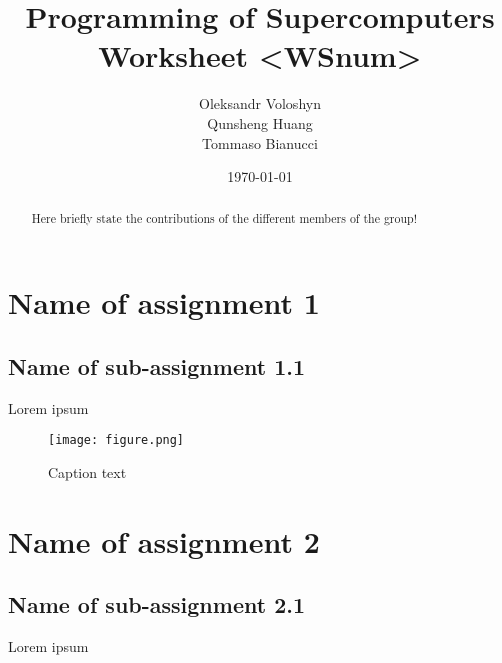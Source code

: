 \documentclass{article}
\title{Programming of Supercomputers\\Worksheet <WSnum>}
\author{Oleksandr Voloshyn\\ Qunsheng Huang\\ Tommaso Bianucci}
\date{\today}
\begin{document}
\maketitle
\renewcommand{\abstractname}{Group members's contributions}
\begin{abstract}
	Here briefly state the contributions of the different members of the group!
\end{abstract}

\section{Name of assignment 1}
\subsection{Name of sub-assignment 1.1}
Lorem ipsum

\begin{figure}[h!] %
 	\begin{center}
 		\texttt{[image: figure.png]} %
 		\caption{Caption text}
 		\label{fig:figureLabelName}
 	\end{center}
\end{figure}

\section{Name of assignment 2}
\subsection{Name of sub-assignment 2.1}
Lorem ipsum
\end{document}
